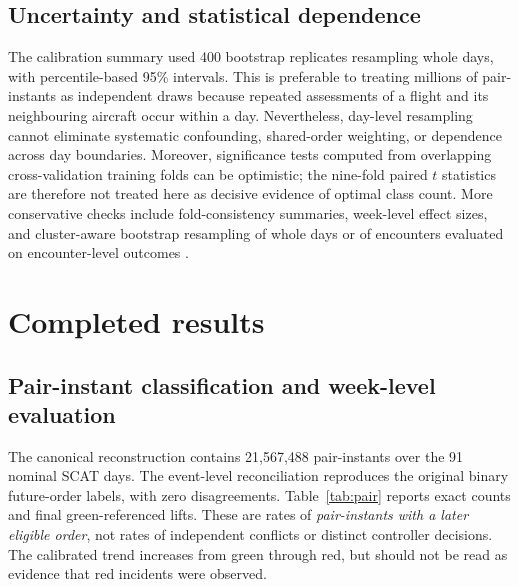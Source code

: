 \documentclass[pdflatex,sn-mathphys-num]{sn-jnl}
\begin{document}
\subsection{Uncertainty and statistical dependence}\label{sec:uncertainty}
The calibration summary used 400 bootstrap replicates resampling whole days, with percentile-based 95\% intervals. This is preferable to treating millions of pair-instants as independent draws because repeated assessments of a flight and its neighbouring aircraft occur within a day. Nevertheless, day-level resampling cannot eliminate systematic confounding, shared-order weighting, or dependence across day boundaries. Moreover, significance tests computed from overlapping cross-validation training folds can be optimistic; the nine-fold paired $t$ statistics are therefore not treated here as decisive evidence of optimal class count. More conservative checks include fold-consistency summaries, week-level effect sizes, and cluster-aware bootstrap resampling of whole days or of encounters evaluated on encounter-level outcomes \cite{field2007}.

\section{Completed results}\label{sec:results}
\subsection{Pair-instant classification and week-level evaluation}
The canonical reconstruction contains 21,567,488 pair-instants over the 91 nominal SCAT days. The event-level reconciliation reproduces the original binary future-order labels, with zero disagreements. Table~\ref{tab:pair} reports exact counts and final green-referenced lifts. These are rates of \emph{pair-instants with a later eligible order}, not rates of independent conflicts or distinct controller decisions. The calibrated trend increases from green through red, but should not be read as evidence that red incidents were observed.
\end{document}
